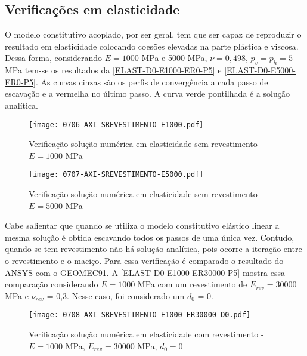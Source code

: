 \subsection{Verificações em elasticidade}

O modelo constitutivo acoplado, por ser geral, tem que ser capaz de reproduzir o resultado em elasticidade colocando coesões elevadas na parte plástica e viscosa. Dessa forma, considerando $E =1000$ MPa e 5000 MPa, $\nu =0,498$, $p_v = p_h = 5$ MPa tem-se os resultados da \autoref{ELAST-D0-E1000-ER0-P5} e \autoref{ELAST-D0-E5000-ER0-P5}. As curvas cinzas são os perfis de convergência a cada passo de escavação e a vermelha no último passo. A curva verde pontilhada é a solução analítica.

\begin{figure}[H]
	\begin{center}
		\texttt{[image: 0706-AXI-SREVESTIMENTO-E1000.pdf]}
	\end{center}
	\caption{\label{ELAST-D0-E1000-ER0-P5}Verificação solução numérica em elasticidade sem revestimento - $E= 1000$ MPa}
\end{figure}

\begin{figure}[H]
	\begin{center}
		\texttt{[image: 0707-AXI-SREVESTIMENTO-E5000.pdf]}
	\end{center}
	\caption{\label{ELAST-D0-E5000-ER0-P5}Verificação solução numérica em elasticidade sem revestimento - $E = 5000$ MPa}
\end{figure}

Cabe salientar que quando se utiliza o modelo constitutivo elástico linear a mesma solução é obtida escavando todos os passos de uma única vez. Contudo, quando se tem revestimento não há solução analítica, pois ocorre a iteração entre o revestimento e o maciço. Para essa verificação é comparado o resultado do ANSYS com o GEOMEC91. A \autoref{ELAST-D0-E1000-ER30000-P5} mostra essa comparação considerando $E=1000$ MPa com um revestimento de $E_{rev}= 30000$ MPa e $\nu_{rev}$ = 0,3. Nesse caso, foi considerado um $d_0$ = 0.

\begin{figure}[H]
	\begin{center}
		\texttt{[image: 0708-AXI-SREVESTIMENTO-E1000-ER30000-D0.pdf]}
	\end{center}
	\caption{\label{ELAST-D0-E1000-ER30000-P5}Verificação solução numérica em elasticidade com revestimento - $E = 1000$ MPa, $E_{rev} = 30000$ MPa, $d_0= 0$}
\end{figure}

